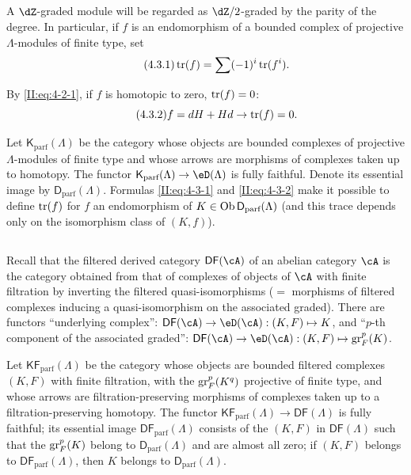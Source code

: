 \subsection{}\label{II:4-3}

A $\dZ$-graded module will be regarded as $\dZ/2$-graded by the parity of
the degree. In particular, if $f$ is an endomorphism of a bounded complex of
projective $\Lambda$-modules of finite type, set
\begin{equation*}\tag{4.3.1}\label{II:eq:4-3-1}
  \operatorname{tr}(f) = \sum (-1)^i \operatorname{tr}(f^i) \text{.}
\end{equation*}

By \eqref{II:eq:4-2-1}, if $f$ is homotopic to zero, $\operatorname{tr}(f) = 0$:
\begin{equation*}\tag{4.3.2}\label{II:eq:4-3-2}
  f = d H + H d \rightarrow \operatorname{tr}(f) = 0 \text{.}
\end{equation*}

Let $\mathsf{K}_\text{parf}(\Lambda)$ be the category whose objects are
bounded complexes of projective $\Lambda$-modules of finite type and whose
arrows are morphisms of complexes taken up to homotopy. The functor
$\mathsf{K}_\text{parf}(\Lambda)\to\eD(\Lambda)$ is fully faithful. Denote its
essential image by $\mathsf{D}_\text{parf}(\Lambda)$. Formulas
\eqref{II:eq:4-3-1} and \eqref{II:eq:4-3-2} make it possible to define
$\operatorname{tr}(f)$ for $f$ an endomorphism of
$K\in\operatorname{Ob} \mathsf{D}_\text{parf}(\Lambda)$ (and this trace depends only on the
isomorphism class of $(K,f)$).






\subsection{}\label{II:4-4}

Recall that the filtered derived category $\mathsf{DF}(\cA)$ of an abelian
category $\cA$ is the category obtained from that of complexes of objects of
$\cA$ with finite filtration by inverting the filtered quasi-isomorphisms
($=$ morphisms of filtered complexes inducing a quasi-isomorphism on the
associated graded). There are functors ``underlying complex'':
$\mathsf{DF}(\cA)\to\eD(\cA): (K,F)\mapsto K$, and ``$p$-th component of the
associated graded'':
$\mathsf{DF}(\cA)\to\eD(\cA): (K,F)\mapsto \gr_F^p(K)$.

Let $\mathsf{KF}_\text{parf}(\Lambda)$ be the category whose objects are
bounded filtered complexes $(K,F)$ with finite filtration, with the
$\operatorname{gr}_F^p(K^q)$ projective of finite type, and whose arrows are
filtration-preserving morphisms of complexes taken up to a
filtration-preserving homotopy. The functor
$\mathsf{KF}_\text{parf}(\Lambda)\to\mathsf{DF}(\Lambda)$ is fully faithful;
its essential image $\mathsf{DF}_\text{parf}(\Lambda)$ consists of the $(K,F)$ in
$\mathsf{DF}(\Lambda)$ such that the $\operatorname{gr}_F^p(K)$ belong to
$\mathsf{D}_\text{parf}(\Lambda)$ and are almost all zero; if $(K,F)$ belongs to
$\mathsf{DF}_\text{parf}(\Lambda)$, then $K$ belongs to
$\mathsf{D}_\text{parf}(\Lambda)$.

